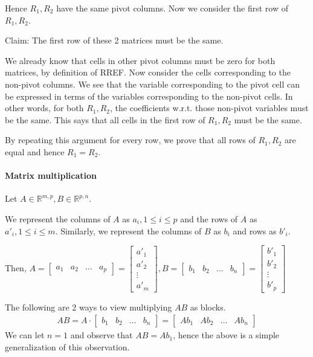\documentclass{article}
\newcommand{\colMat}[2]{\begin{bmatrix}
	{#1}_1 & {#1}_2 & \dots & {#1}_{#2}
\end{bmatrix}}
\begin{document}
Hence $R_1, R_2$ have the same pivot columns. Now we consider the first row of $R_1, R_2$.

Claim: The first row of these 2 matrices must be the same.

We already know that cells in other pivot columns must be zero for both matrices, by definition of RREF. Now consider the cells corresponding to the non-pivot columns. We see that the variable corresponding to the pivot cell can be expressed in terms of the variables corresponding to the non-pivot cells. In other words, for both $R_1, R_2$, the coefficients w.r.t. those non-pivot variables must be the same. This says that all cells in the first row of $R_1, R_2$ must be the same.

By repeating this argument for every row, we prove that all rows of $R_1, R_2$ are equal and hence $R_1 = R_2$.


\paragraph{Matrix multiplication}
Let $A\in \mathbb{R}^{m,p}, B\in \mathbb{R}^{p,n}$.

We represent the columns of $A$ as $a_i, 1\leq i\leq p$ and the rows of $A$ as $a'_i, 1\leq i\leq m$. Similarly, we represent the columns of $B$ as $b_i$ and rows as $b'_i$.

Then,
$A = \begin{bmatrix}
	a_1 & a_2 & \dots & a_p
\end{bmatrix} = \begin{bmatrix}
	a'_1\\ a'_2\\ \vdots \\ a'_m
\end{bmatrix}, B = \begin{bmatrix}
	b_1 & b_2 & \dots & b_n
\end{bmatrix} = \begin{bmatrix}
	b'_1\\ b'_2\\ \vdots \\ b'_p
\end{bmatrix}$

The following are 2 ways to view multiplying $AB$ as blocks.
\begin{align*}
	AB = A\cdot \colMat{b}{n} = \begin{bmatrix}
	Ab_1 & Ab_2 & \dots & Ab_n
	\end{bmatrix}
\end{align*}
We can let $n=1$ and observe that $AB = Ab_1$, hence the above is a simple generalization of this observation.
\end{document}

